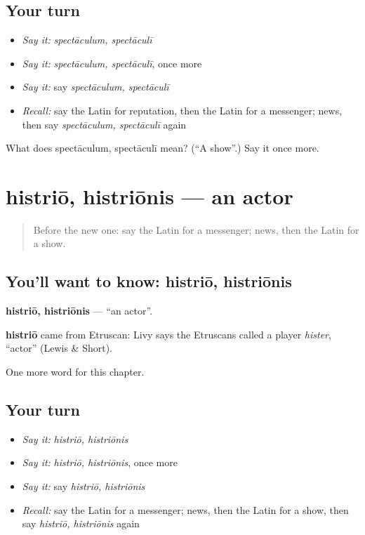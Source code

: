 \subsection*{Your turn}
\begin{itemize}
\raggedright
  \item \emph{Say it:} \emph{spectāculum, spectāculī}
  \item \emph{Say it:} \emph{spectāculum, spectāculī}, once more
  \item \emph{Say it:} say \emph{spectāculum, spectāculī}
  \item \emph{Recall:} say the Latin for reputation, then the Latin for a messenger; news, then say \emph{spectāculum, spectāculī} again
\end{itemize}

\begin{tcolorbox}[breakable,colback=teal!4,colframe=teal!35!black,title={Before you move on}]
What does spectāculum, spectāculī mean? (\textquotedblleft{}A show\textquotedblright{}.) Say it once more.
\end{tcolorbox}
\section[histriō, histriōnis]{histriō, histriōnis — an actor}

\label{lesson:LA-C219-histrio}



\begin{quote}
Before the new one: say the Latin for a messenger; news, then the Latin for a show.
\end{quote}

\subsection*{You'll want to know: histriō, histriōnis}
\textbf{histriō, histriōnis} — \textquotedblleft{}an actor\textquotedblright{}.

\begin{cousinweb}
\textbf{histriō} came from Etruscan: Livy says the Etruscans called a player \emph{hister}, \textquotedblleft{}actor\textquotedblright{} (Lewis \& Short).
\end{cousinweb}

\begin{grammarlens}[title={What you've built}]
One more word for this chapter.
\end{grammarlens}

\subsection*{Your turn}
\begin{itemize}
\raggedright
  \item \emph{Say it:} \emph{histriō, histriōnis}
  \item \emph{Say it:} \emph{histriō, histriōnis}, once more
  \item \emph{Say it:} say \emph{histriō, histriōnis}
  \item \emph{Recall:} say the Latin for a messenger; news, then the Latin for a show, then say \emph{histriō, histriōnis} again
\end{itemize}

